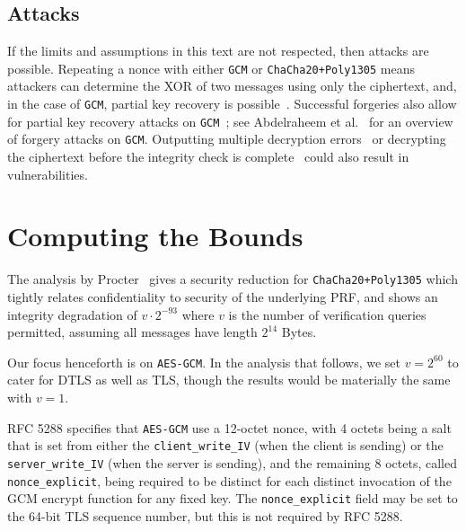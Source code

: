 \documentclass{article}
\begin{document}
\subsection{Attacks}
If the limits and assumptions in this text are not respected, then attacks are possible. Repeating a nonce with either \texttt{GCM} or \texttt{ChaCha20+Poly1305} means attackers can determine the XOR of two messages using only the ciphertext, and, in the case of \texttt{GCM}, partial key recovery is possible~\cite{JouxAuthenticationFailures}. Successful forgeries also allow for partial key recovery attacks on \texttt{GCM}~\cite{DBLP:conf/crypto/HandschuhP08}; see Abdelraheem et al.~\cite{DBLP:conf/eurocrypt/AbdelraheemBBT15,DBLP:journals/iacr/AbdelraheemBBT15} for an overview of forgery attacks on \texttt{GCM}. Outputting multiple decryption errors~\cite{DBLP:conf/fse/BoldyrevaDPS13,DBLP:journals/iacr/BoldyrevaDPS13} or decrypting the ciphertext before the integrity check is complete~\cite{DBLP:conf/asiacrypt/AndreevaBLMMY14,DBLP:journals/iacr/AndreevaBLMMY14} could also result in vulnerabilities.

\section{Computing the Bounds}

The analysis by Procter~\cite{DBLP:journals/iacr/Procter14a} gives a security reduction for \texttt{ChaCha20+Poly1305} which tightly relates confidentiality to security of the underlying PRF, and shows an integrity degradation of $v \cdot 2^{-93}$ where $v$ is the number of verification queries permitted, assuming all messages have length $2^{14}$ Bytes.


Our focus henceforth is on \texttt{AES-GCM}. In the analysis that follows, we set $v = 2^{60}$ to cater for DTLS as well as TLS, though the results would be materially the same with $v=1$.

RFC 5288 specifies that \texttt{AES-GCM} use a 12-octet nonce, with 4 octets being a salt that is set from either the \verb|client_write_IV| (when the client is sending) or the \verb|server_write_IV| (when the server is sending), and the remaining 8 octets, called \verb|nonce_explicit|, being required to be distinct for each distinct invocation of the GCM encrypt function for any fixed key. The  \verb|nonce_explicit| field may be set to the 64-bit TLS sequence number, but this is not required by RFC 5288. 
\end{document}
